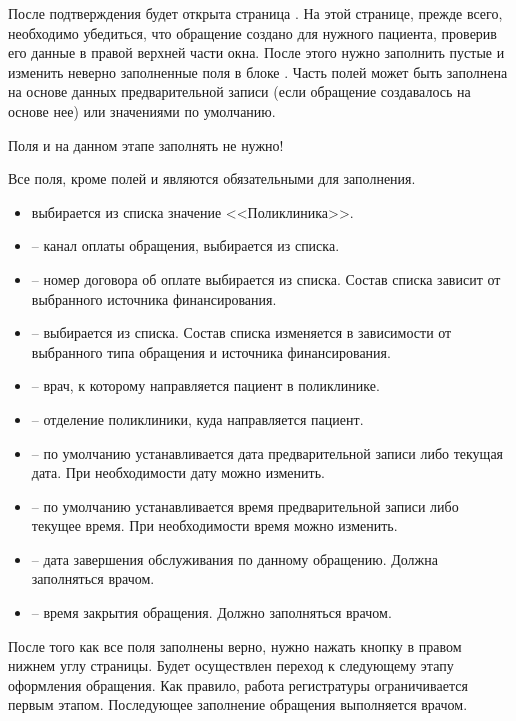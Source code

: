После подтверждения будет открыта страница . На этой странице, прежде всего, необходимо убедиться, что обращение создано для нужного пациента, проверив его данные в правой верхней части окна. После этого нужно заполнить пустые и изменить неверно заполненные поля в блоке . Часть полей может быть заполнена на основе данных предварительной записи (если обращение создавалось на основе нее) или значениями по умолчанию.

\begin{vnim}
 Поля  и  на данном этапе заполнять не нужно!
\end{vnim}

Все поля, кроме полей  и  являются обязательными для заполнения.
\begin{itemize}
 \item {} выбирается из списка значение <<Поликлиника>>.
 \item {} – канал оплаты обращения, выбирается из списка.
 \item {} – номер договора об оплате выбирается из списка. Состав списка зависит от выбранного источника финансирования.
 \item {} – выбирается из списка. Состав списка изменяется в зависимости от выбранного типа обращения и источника финансирования.
 \item {} – врач, к которому направляется пациент в поликлинике.
 \item {} – отделение поликлиники, куда направляется пациент.
 \item {} – по умолчанию устанавливается дата предварительной записи либо текущая дата. При необходимости дату можно изменить.
 \item {} – по умолчанию устанавливается время предварительной записи либо текущее время. При необходимости время можно изменить.
 \item {} – дата завершения обслуживания по данному обращению. Должна заполняться врачом.
 \item {} – время закрытия обращения. Должно заполняться врачом.
\end{itemize}

После того как все поля заполнены верно, нужно нажать кнопку  в правом нижнем углу страницы. Будет осуществлен переход к следующему этапу оформления обращения. Как правило, работа регистратуры ограничивается первым этапом. Последующее заполнение обращения выполняется врачом.

